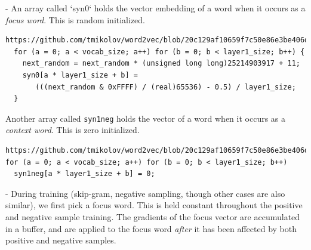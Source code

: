 \documentclass{book}
\begin{document}
- An array called `syn0` holds the vector embedding of a word when it occurs
  as a \emph{focus word}. This is random initialized.

\begin{verbatim}
https://github.com/tmikolov/word2vec/blob/20c129af10659f7c50e86e3be406df663beff438/word2vec.c#L369
  for (a = 0; a < vocab_size; a++) for (b = 0; b < layer1_size; b++) {
    next_random = next_random * (unsigned long long)25214903917 + 11;
    syn0[a * layer1_size + b] =
       (((next_random & 0xFFFF) / (real)65536) - 0.5) / layer1_size;
  }
\end{verbatim}

Another array called \texttt{syn1neg} holds the vector of a word when it occurs
as a \emph{context word}. This is zero initialized.

\begin{verbatim}
https://github.com/tmikolov/word2vec/blob/20c129af10659f7c50e86e3be406df663beff438/word2vec.c#L365
for (a = 0; a < vocab_size; a++) for (b = 0; b < layer1_size; b++)
  syn1neg[a * layer1_size + b] = 0;
\end{verbatim}

- During training (skip-gram, negative sampling, though other cases are
  also similar), we first pick a focus word. This is held constant throughout
  the positive and negative sample training. The gradients of the focus vector
  are accumulated in a buffer, and are applied to the focus word
  \emph{after} it has been affected by both positive and negative samples.
\end{document}
